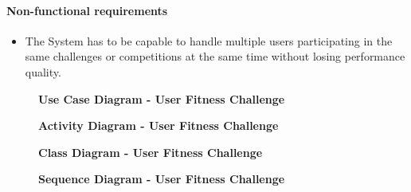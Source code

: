 \documentclass{article}
\begin{document}
	\paragraph{Non-functional requirements}
		\begin{itemize}
			\item The System has to be capable to handle multiple users participating in the same challenges or
			competitions at the same time without losing performance quality.
			
		\end{itemize}

\clearpage

\begin{figure}[htbp]
	\textbf{Use Case Diagram - User Fitness Challenge}
	\centering
	\begin{subfigure}{\textwidth}
		\resizebox{\textwidth}{!}{}
	\end{subfigure}
	\begin{subfigure}{\textwidth}
	\end{subfigure}
\end{figure}


\clearpage

\begin{figure}[htbp]
	\textbf{Activity Diagram - User Fitness Challenge}
	\centering
	\begin{subfigure}{\textwidth}
		\resizebox{\textwidth}{!}{}
	\end{subfigure}
	\begin{subfigure}{\textwidth}
	\end{subfigure}
\end{figure}

\clearpage

\begin{figure}[htbp]
	\textbf{Class Diagram - User Fitness Challenge}
	\centering
	\begin{subfigure}{\textwidth}
		\resizebox{\textwidth}{!}{}
	\end{subfigure}
	\begin{subfigure}{\textwidth}
	\end{subfigure}
\end{figure}

\clearpage

\begin{figure}[htbp]
	\textbf{Sequence Diagram - User Fitness Challenge}
	\centering
	\begin{subfigure}{\textwidth}
		\resizebox{\textwidth}{!}{}
	\end{subfigure}
	\begin{subfigure}{\textwidth}
	\end{subfigure}
\end{figure}
\end{document}
